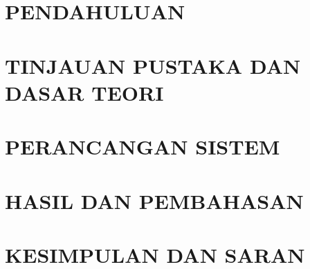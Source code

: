 \documentclass[bahasa]{jtetiskripsi}
\begin{document}


\cover

\approvalpage

\acknowledgment

\preface


\tableofcontents
{}
\listoftables
{}
\listoffigures
{}

%




\chapter{PENDAHULUAN}


\chapter{TINJAUAN PUSTAKA DAN DASAR TEORI}


\chapter{PERANCANGAN SISTEM}


\chapter{HASIL DAN  PEMBAHASAN}


\chapter{KESIMPULAN DAN SARAN}


\clearpage
{}

\end{document}
